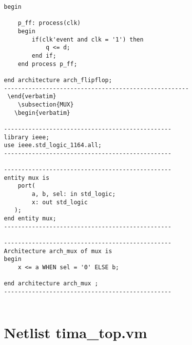 \begin{lstlisting}
begin

    p_ff: process(clk)
    begin
        if(clk'event and clk = '1') then
            q <= d;
        end if;
    end process p_ff;

end architecture arch_flipflop;
-----------------------------------------------------
 \end{verbatim}
    \subsection{MUX}
   \begin{verbatim}

------------------------------------------------
library ieee;
use ieee.std_logic_1164.all;
------------------------------------------------

------------------------------------------------
entity mux is
    port(
        a, b, sel: in std_logic;
        x: out std_logic
   );
end entity mux;
------------------------------------------------

------------------------------------------------
Architecture arch_mux of mux is
begin
    x <= a WHEN sel = '0' ELSE b;

end architecture arch_mux ;
------------------------------------------------


 \end{lstlisting}
   
   


\section{ Netlist tima\_top.vm}
  
